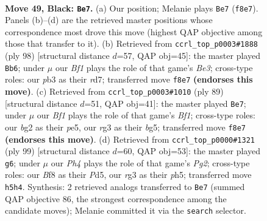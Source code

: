 \documentclass[11pt]{article}
\begin{document}
\clearpage

\begin{figure}[p]\centering
\begin{subfigure}{0.46\textwidth}\centering
\resizebox{\linewidth}{!}{%
\newchessgame
\chessboard[
  setfen={3r1b2/7p/p2pn1k1/P3p1Pp/1BP1P3/1P3PR1/2K3B1/8 b - - 0 49},
  showmover=false,
  pgfstyle=straightmove, color=movearrow, markmove={f8-e7}
]}
\caption{}
\end{subfigure}\hfill
\begin{subfigure}{0.46\textwidth}\centering
\resizebox{\linewidth}{!}{%
\newchessgame
\chessboard[
  setfen={2k5/1b1rb3/3p2p1/1p1P2Pp/pP2N2P/4BK2/1P6/3R4 w - - 9 50},
  showmover=false,
  pgfstyle=straightmove, color=movearrow, markmove={e3-b6}
]}
\caption{}
\end{subfigure}
\\[4pt]
\begin{subfigure}{0.46\textwidth}\centering
\resizebox{\linewidth}{!}{%
\newchessgame
\chessboard[
  setfen={4rbk1/6p1/4p3/p1n1P1B1/1pB2P2/1Pp4P/P4KP1/4R3 b - - 4 45},
  showmover=false,
  pgfstyle=straightmove, color=movearrow, markmove={f8-e7}
]}
\caption{}
\end{subfigure}\hfill
\begin{subfigure}{0.46\textwidth}\centering
\resizebox{\linewidth}{!}{%
\newchessgame
\chessboard[
  setfen={6k1/6pp/r1b1p3/1n1pP2P/1BpP1P2/p1P1K1P1/8/R2B4 b - - 2 50},
  showmover=false,
  pgfstyle=straightmove, color=movearrow, markmove={g7-g6}
]}
\caption{}
\end{subfigure}
\caption{\textbf{Move 49, Black: \texttt{Be7}.} (a) Our position; Melanie plays \texttt{Be7} (\texttt{f8e7}). Panels (b)--(d) are the retrieved master positions whose correspondence most drove this move (highest QAP objective among those that transfer to it). (b) Retrieved from \texttt{ccrl\_top\_p0003\#1888} (ply 98) [structural distance $d$=57, QAP obj=45]: the master played \texttt{Bb6}; under $\mu$ our \emph{Bf1} plays the role of that game's \emph{Be3}; cross-type roles: our \emph{p}b3 as their \emph{r}d7; transferred move \texttt{f8e7} \textbf{(endorses this move)}. (c) Retrieved from \texttt{ccrl\_top\_p0003\#1010} (ply 89) [structural distance $d$=51, QAP obj=41]: the master played \texttt{Be7}; under $\mu$ our \emph{Bf1} plays the role of that game's \emph{Bf1}; cross-type roles: our \emph{b}g2 as their \emph{p}e5, our \emph{r}g3 as their \emph{b}g5; transferred move \texttt{f8e7} \textbf{(endorses this move)}. (d) Retrieved from \texttt{ccrl\_top\_p0000\#1321} (ply 99) [structural distance $d$=60, QAP obj=53]: the master played \texttt{g6}; under $\mu$ our \emph{Ph4} plays the role of that game's \emph{Pg2}; cross-type roles: our \emph{B}f8 as their \emph{P}d5, our \emph{r}g3 as their \emph{p}h5; transferred move \texttt{h5h4}. Synthesis: 2 retrieved analogs transferred to \texttt{Be7} (summed QAP objective 86, the strongest correspondence among the candidate moves); Melanie committed it via the \texttt{search} selector.}
\label{fig:thought-m97}
\end{figure}
\end{document}
